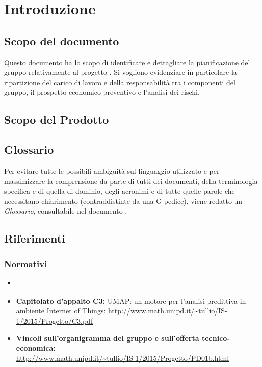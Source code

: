 \section{Introduzione}

\subsection{Scopo del documento}
Questo documento ha lo scopo di identificare e dettagliare la pianificazione del gruppo \GroupName{} relativamente al progetto \ProjectName{}. Si vogliono evidenziare in particolare la ripartizione del carico di lavoro e della responsabilità tra i componenti del gruppo, il prospetto economico preventivo e l'analisi dei rischi.

\subsection{Scopo del Prodotto}
\ScopoDelProdotto

\subsection{Glossario}
Per evitare tutte le possibili ambiguità sul linguaggio utilizzato e per massimizzare la comprensione da parte di tutti dei documenti, della terminologia specifica e di quella di dominio, degli acronimi e di tutte quelle parole che necessitano chiarimento (contraddistinte da una G pedice), viene redatto un \textit{Glossario}, consultabile nel documento \Glossario.

\subsection{Riferimenti}
\subsubsection{Normativi}
\begin{itemize}
\item \textbf{\NormeDiProgetto}
\item\textbf{ Capitolato d'appalto C3:} UMAP: un motore per l'analisi predittiva in ambiente Internet of Things: \url{http://www.math.unipd.it/~tullio/IS-1/2015/Progetto/C3.pdf}
\item \textbf{Vincoli sull'organigramma del gruppo e sull'offerta tecnico-economica:} \\ \url{http://www.math.unipd.it/~tullio/IS-1/2015/Progetto/PD01b.html}
\end{itemize}


